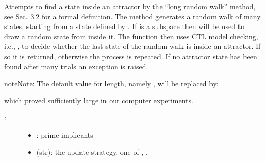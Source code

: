 \documentclass[letterpaper,10pt,english]{sphinxmanual}
\begin{document}
\begin{fulllineitems}
\label{\detokenize{Attractors:PyBoolNet.Attractors.find_attractor_state_by_randomwalk_and_ctl}}
Attempts to find a state inside an attractor by the “long random walk” method,
see {\hyperref[\detokenize{Bibliography:klarner2015approx}]{}} Sec. 3.2 for a formal definition.
The method generates a random walk of  many states, starting from a state defined by .
If  is a subspace then {\hyperref[\detokenize{StateTransitionGraphs:random-state}]{}} will be used to draw a random state from inside it.
The function then uses CTL model checking, i.e., {\hyperref[\detokenize{ModelChecking:check-primes}]{}},
to decide whether the last state of the random walk is inside an attractor.
If so it is returned, otherwise the process is repeated.
If no attractor state has been found after  many trials an exception is raised.

\begin{sphinxadmonition}{note}{Note:}
The default value for length, namely , will be replaced by:

\begin{sphinxVerbatim}[commandchars=\\\{\}]
  
\end{sphinxVerbatim}

which proved sufficiently large in our computer experiments.
\end{sphinxadmonition}
\begin{description}
\item[{:}] \leavevmode\begin{itemize}
\item {} 
: prime implicants

\item {} 
 (str):  the update strategy, one of , , 


\end{itemize}
\end{description}
\end{fulllineitems}
\end{document}

